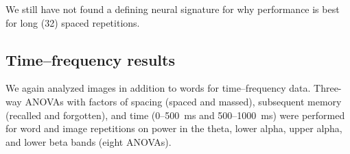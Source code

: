 
We still have not found a defining neural signature for why performance is best for long (32) spaced repetitions.

\subsection{Time--frequency results}

We again analyzed images in addition to words for time--frequency data.
Three-way ANOVAs with factors of spacing (spaced and massed), subsequent memory (recalled and forgotten), and time (0--500~ms and 500--1000~ms) were performed for word and image repetitions on power in the theta, lower alpha, upper alpha, and lower beta bands (eight ANOVAs).



